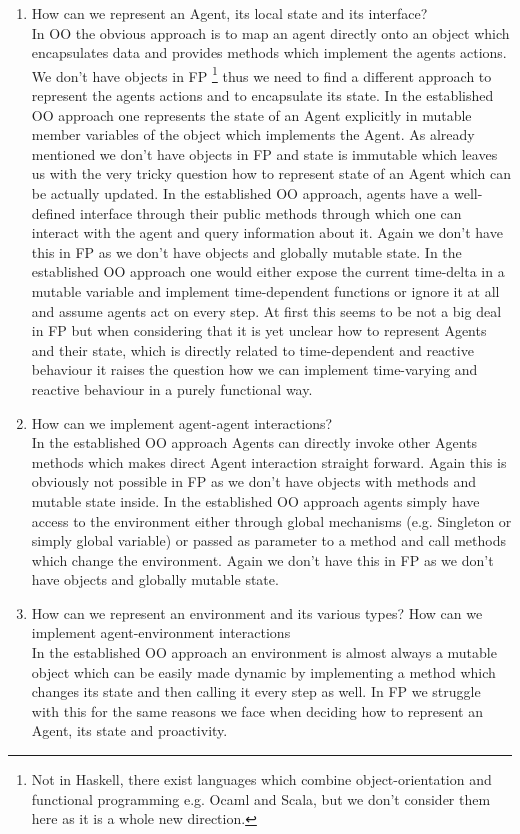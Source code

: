 \begin{enumerate}
	\item How can we represent an Agent, its local state and its interface? \\
	In OO the obvious approach is to map an agent directly onto an object which encapsulates data and provides methods which implement the agents actions. We don't have objects in FP \footnote{Not in Haskell, there exist languages which combine object-orientation and functional programming e.g. Ocaml and Scala, but we don't consider them here as it is a whole new direction.} thus we need to find a different approach to represent the agents actions and to encapsulate its state.
	In the established OO approach one represents the state of an Agent explicitly in mutable member variables of the object which implements the Agent. As already mentioned we don't have objects in FP and state is immutable which leaves us with the very tricky question how to represent state of an Agent which can be actually updated.
	In the established OO approach, agents have a well-defined interface through their public methods through which one can interact with the agent and query information about it. Again we don't have this in FP as we don't have objects and globally mutable state.
	In the established OO approach one would either expose the current time-delta in a mutable variable and implement time-dependent functions or ignore it at all and assume agents act on every step. At first this seems to be not a big deal in FP but when considering that it is yet unclear how to represent Agents and their state, which is directly related to time-dependent and reactive behaviour it raises the question how we can implement time-varying and reactive behaviour in a purely functional way.

	\item How can we implement agent-agent interactions? \\
	In the established OO approach Agents can directly invoke other Agents methods which makes direct Agent interaction straight forward. Again this is obviously not possible in FP as we don't have objects with methods and mutable state inside.
	In the established OO approach agents simply have access to the environment either through global mechanisms (e.g. Singleton or simply global variable) or passed as parameter to a method and call methods which change the environment. Again we don't have this in FP as we don't have objects and globally mutable state.
	
	\item How can we represent an environment and its various types? How can we implement agent-environment interactions \\
	In the established OO approach an environment is almost always a mutable object which can be easily made dynamic by implementing a method which changes its state and then calling it every step as well. In FP we struggle with this for the same reasons we face when deciding how to represent an Agent, its state and proactivity.
	

\end{enumerate}
